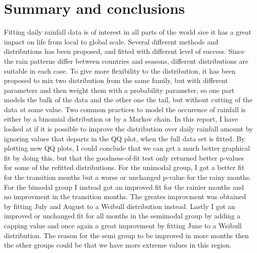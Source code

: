 \documentclass{article}
\begin{document}
	\section{Summary and conclusions}
	Fitting daily rainfall data is of interest in all parts of the world sice it has a great impact on life from local to global scale. Several different methods and distributions has been proposed, and fitted with different level of success. Since the rain patterns differ between countries and seasons, different distributions are suitable in each case. To give more flexibility to the distribution, it has been proposed to mix two distribution from the same family, but with different parameters and then weight them with a probability parameter, so one part models the bulk of the data and the other one the tail, but without cutting of the data at some value. Two common practices to model the occurence of rainfall is either by a binomial distribution or by a Markov chain. In this report, I have looked at if it is possible to improve the distribution over daily rainfall amount by ignoring values that departs in the QQ plot, when the full data set is fitted. By plotting new QQ plots, I could conclude that we can get a much better graphical fit by doing this, but that the goodness-of-fit test only returned better p-values for some of the refitted distributions. For the unimodal group, I got a better fit for the transition months but a worse or unchanged p-value for the rainy months. For the bimodal group I instead got an improved fit for the rainier months and no improvment in the transition months. The greates improvment was obtained by fitting July and August to a Weibull distribution instead. Lastly I got an improved or unchanged fit for all months in the semimodal group by adding a capping value and once again a great improvment by fitting June to a Weibull distribution. The reason for the semi group to be improved in more months then the other groups could be that we have more extreme values in this region. 
\end{document}
